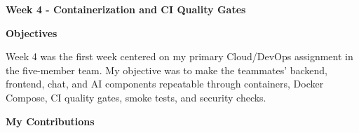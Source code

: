 \vspace{0.5em}\noindent\textbf{Week 4 - Containerization and CI Quality
Gates}\par

\vspace{0.5em}\noindent\textbf{Objectives}\par

Week 4 was the first week centered on my primary Cloud/DevOps assignment
in the five-member team. My objective was to make the teammates'
backend, frontend, chat, and AI components repeatable through
containers, Docker Compose, CI quality gates, smoke tests, and security
checks.

\vspace{0.5em}\noindent\textbf{My Contributions}\par

